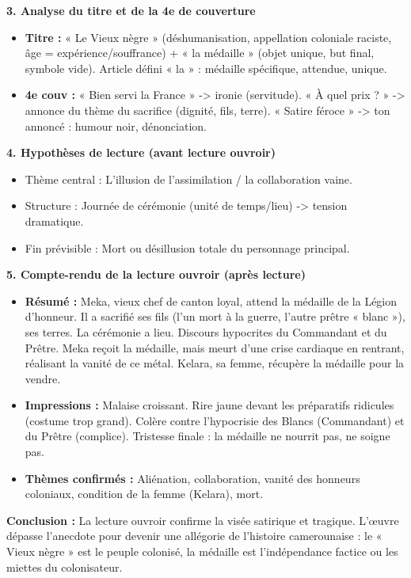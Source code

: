 \documentclass[11pt]{article}
\begin{document}
\begin{exoresolu}
\textbf{3. Analyse du titre et de la 4e de couverture}
\begin{itemize}
    \item \textbf{Titre :} « Le Vieux nègre » (déshumanisation, appellation coloniale raciste, âge = expérience/souffrance) + « la médaille » (objet unique, but final, symbole vide). Article défini « la » : médaille spécifique, attendue, unique.
    \item \textbf{4e couv :} « Bien servi la France » -> ironie (servitude). « À quel prix ? » -> annonce du thème du sacrifice (dignité, fils, terre). « Satire féroce » -> ton annoncé : humour noir, dénonciation.
\end{itemize}

\textbf{4. Hypothèses de lecture (avant lecture ouvroir)}
\begin{itemize}
    \item Thème central : L'illusion de l'assimilation / la collaboration vaine.
    \item Structure : Journée de cérémonie (unité de temps/lieu) -> tension dramatique.
    \item Fin prévisible : Mort ou désillusion totale du personnage principal.
\end{itemize}

\textbf{5. Compte-rendu de la lecture ouvroir (après lecture)}
\begin{itemize}
    \item \textbf{Résumé :} Meka, vieux chef de canton loyal, attend la médaille de la Légion d'honneur. Il a sacrifié ses fils (l'un mort à la guerre, l'autre prêtre « blanc »), ses terres. La cérémonie a lieu. Discours hypocrites du Commandant et du Prêtre. Meka reçoit la médaille, mais meurt d'une crise cardiaque en rentrant, réalisant la vanité de ce métal. Kelara, sa femme, récupère la médaille pour la vendre.
    \item \textbf{Impressions :} Malaise croissant. Rire jaune devant les préparatifs ridicules (costume trop grand). Colère contre l'hypocrisie des Blancs (Commandant) et du Prêtre (complice). Tristesse finale : la médaille ne nourrit pas, ne soigne pas.
    \item \textbf{Thèmes confirmés :} Aliénation, collaboration, vanité des honneurs coloniaux, condition de la femme (Kelara), mort.
\end{itemize}

\textbf{Conclusion :} La lecture ouvroir confirme la visée satirique et tragique. L'œuvre dépasse l'anecdote pour devenir une allégorie de l'histoire camerounaise : le « Vieux nègre » est le peuple colonisé, la médaille est l'indépendance factice ou les miettes du colonisateur.
\end{exoresolu}
\end{document}
